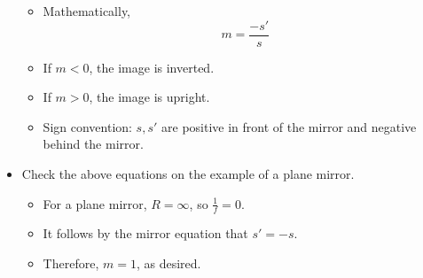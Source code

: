 \documentclass[../notes.tex]{subfiles}
\begin{document}
\begin{itemize}
    \begin{itemize}
        \item Mathematically,
        \begin{equation*}
            m = \frac{-s'}{s}
        \end{equation*}
        \item If $m<0$, the image is inverted.
        \item If $m>0$, the image is upright.
        \item Sign convention: $s,s'$ are positive in front of the mirror and negative behind the mirror.
    \end{itemize}
    \item Check the above equations on the example of a plane mirror.
    \begin{itemize}
        \item For a plane mirror, $R=\infty$, so $\frac{1}{f}=0$.
        \item It follows by the mirror equation that $s'=-s$.
        \item Therefore, $m=1$, as desired.
    \end{itemize}
\end{itemize}
\end{document}
